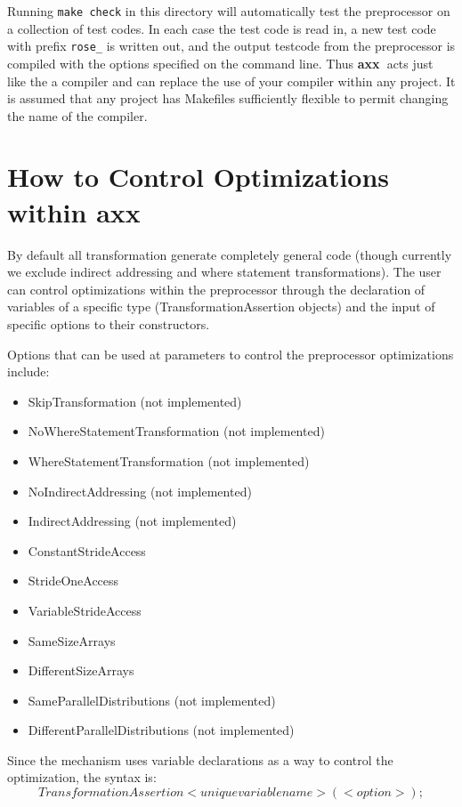 \documentclass[10pt]{article}
\newcommand{\axx}{{\bf axx\ }}
\begin{document}
  Running {\tt make check} in this directory
will automatically test the preprocessor on a collection of test codes.  In each case the test code
is read in, a new test code with prefix {\tt rose\_} is written out, and the output testcode from the
preprocessor is compiled with the options specified on the command line.  Thus \axx acts just like the
a compiler and can replace the use of your compiler within any project.  It is assumed that any project
has Makefiles sufficiently flexible to permit changing the name of the compiler.

\section{How to Control Optimizations within \axx}
    By default all transformation generate completely general code (though currently we exclude
indirect addressing and where statement transformations).  The user can control optimizations within
the preprocessor through the declaration of variables of a specific type (TransformationAssertion
objects) and the input of specific options to their constructors.

Options that can be used at parameters to control the preprocessor optimizations include:
\begin{itemize}
   \item SkipTransformation             (not implemented)
   \item NoWhereStatementTransformation (not implemented)
   \item WhereStatementTransformation   (not implemented)
   \item NoIndirectAddressing           (not implemented)
   \item IndirectAddressing             (not implemented)
   \item ConstantStrideAccess
   \item StrideOneAccess
   \item VariableStrideAccess
   \item SameSizeArrays
   \item DifferentSizeArrays
   \item SameParallelDistributions      (not implemented)
   \item DifferentParallelDistributions (not implemented)
\end{itemize}

   Since the mechanism uses variable declarations as a way to control the optimization, the syntax is:
   $$ TransformationAssertion <unique variable name> (<option>); $$
\end{document}
